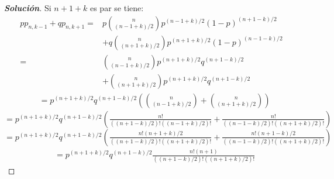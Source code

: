 \documentclass[12pt, letterpaper]{article}
\newenvironment{manualtheorem}[1]{%
  \renewcommand\themanualtheoreminner{#1}%
  \manualtheoreminner
}{\endmanualtheoreminner}
\newenvironment{solucion}
  {\renewcommand\qedsymbol{$\square$}\begin{proof}[\textbf{Solución}]}
  {\end{proof}}
\begin{document}
\begin{manualtheorem}{4.1}
\begin{enumerate}
\begin{solucion}
            Si $n+1+k$ es par se tiene:
            \begin{align*}
                pp_{n,k-1}+qp_{n,k+1}=&p\binom{n}{(n-1+k)/2}p^{(n-1+k)/2}(1-p)^{(n+1-k)/2}\\[0.2cm]
                &+q\binom{n}{(n+1+k)/2}p^{(n+1+k)/2}(1-p)^{(n-1-k)/2}\\[0.5cm]
                =&\binom{n}{(n-1+k)/2}p^{(n+1+k)/2}q^{(n+1-k)/2}\\[0.2cm]
                &+\binom{n}{(n+1+k)/2}p^{(n+1+k)/2}q^{(n+1-k)/2}
            \end{align*}
            \begin{align*}
            & =p^{(n+1+k)/2}q^{(n+1-k)/2}\left( \binom{n}{(n-1+k)/2}+\binom{n}{(n+1+k)/2} \right)
            \end{align*}
            $=p^{(n+1+k)/2}q^{(n+1-k)/2} \left( \frac{n!}{((n+1-k)/2)!((n-1+k)/2)!} + \frac{n!}{((n-1-k)/2)!((n+1+k)/2)!} \right ) $ \\[0.2cm]
            $=p^{(n+1+k)/2}q^{(n+1-k)/2} \left( \frac{n!(n+1+k)/2}{((n+1-k)/2)!((n+1+k)/2)!} + \frac{n!(n+1-k)/2}{((n-1-k)/2)!((n+1+k)/2)!} \right ) $
            \begin{align*}
            &=p^{(n+1+k)/2}q^{(n+1-k)/2}\frac{n!(n+1)}{((n+1-k)/2)!((n+1+k)/2)!}
            \end{align*}
        \end{solucion}
    \end{enumerate}
    \end{manualtheorem}
    
\end{document}
